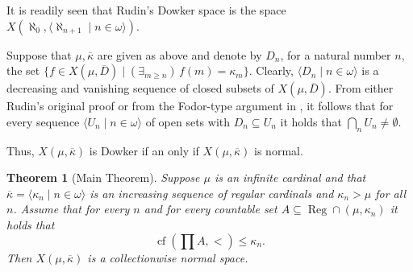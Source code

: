 \documentclass{amsart}
\newtheorem{theorem}{Theorem}[section]
\theoremstyle{remark}
\DeclareMathOperator{\cf}{cf}
\DeclareMathOperator{\Reg}{Reg}
\renewcommand\mid{\mathrel{|}\allowbreak}
\begin{document}
It is readily seen that Rudin's Dowker space is the space \(X(\aleph_{0},\langle \aleph_{{n+1}}\mid n\in \omega\rangle)\).

Suppose that \(\mu,\overline \kappa\)
 are given as above and denote by \(D_n\), for a natural number \(n\), the set 
 \(\{f\in X(\mu,\overline D)\mid (\exists _{m\ge n})\, f(m)=\kappa_m\}\). 
 Clearly, \(\langle D_n\mid n\in \omega\rangle\) is a decreasing and vanishing 
 sequence of closed subsets of \(X(\mu,\overline D)\). From either Rudin's original
 proof or from the Fodor-type argument in \cite{kojsh}, it follows that for every sequence \(\langle U_n\mid n\in \omega\rangle\)
 of open sets with \(D_n\subseteq U_n\) it holds that \(\bigcap_n U_n\not=\emptyset\). 


 Thus, \(X(\mu,\overline \kappa)\) is Dowker if an only if \(X(\mu,\overline \kappa)\) is normal. 
 
 
 
 \begin{theorem}[Main Theorem]
  Suppose \(\mu\) is an infinite cardinal and that \(\overline \kappa=\langle \kappa_{n}\mid n\in \omega\rangle\) is an increasing  sequence of regular
  cardinals and  \(\kappa_{n}>\mu\) for all \(n\).  Assume that for every \(n\) and for every countable set \(A\subseteq \Reg\cap (\mu,\kappa_{n})\) it holds that
  \[\cf(\prod A,<)\le \kappa_{n}.\]
  Then \(X(\mu,\overline \kappa)\) is a collectionwise normal space.
\end{theorem}
\end{document}
